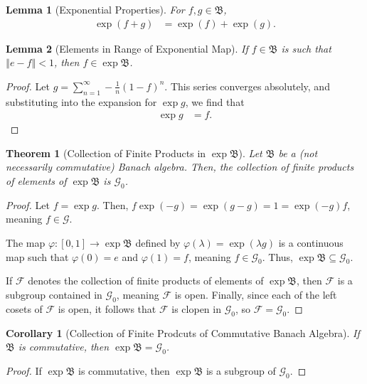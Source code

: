 \documentclass[10pt]{extarticle}
\newcommand{\norm}[1]{\left\Vert #1\right\Vert}
\theoremstyle{plain}
\newtheorem*{theorem}{Theorem}
\newtheorem*{lemma}{Lemma}
\newtheorem*{corollary}{Corollary}
\theoremstyle{definition}
\theoremstyle{note}
\renewcommand{\newline}{\hfill\break}
\begin{document}
\begin{lemma}[Exponential Properties]
  For $f,g\in \mathfrak{B}$,
  \begin{align*}
    \exp(f+g) &= \exp(f) + \exp(g).
  \end{align*}
\end{lemma}
\begin{lemma}[Elements in Range of Exponential Map]
  If $f\in \mathfrak{B}$ is such that $\norm{e-f} < 1$, then $f\in \exp \mathfrak{B}$.
\end{lemma}
\begin{proof}
  Let $g = \sum_{n=1}^{\infty}-\frac{1}{n}(1-f)^n$. This series converges absolutely, and substituting into the expansion for $\exp g$, we find that
  \begin{align*}
    \exp g &= f.
  \end{align*}
\end{proof}
\begin{theorem}[Collection of Finite Products in $\exp\mathfrak{B}$]
  Let $\mathfrak{B}$ be a (not necessarily commutative) Banach algebra. Then, the collection of finite products of elements of $\exp \mathfrak{B}$ is $\mathcal{G}_0$.
\end{theorem}
\begin{proof}
  Let $f = \exp g$. Then, $f\exp(-g) = \exp(g-g) = 1 = \exp(-g)f$, meaning $f\in \mathcal{G}$.\newline

  The map $\varphi: [0,1]\rightarrow \exp \mathfrak{B}$ defined by $\varphi(\lambda) = \exp\left(\lambda g\right)$ is a continuous map such that $\varphi(0) = e$ and $\varphi(1) = f$, meaning $f\in \mathcal{G}_0$. Thus, $\exp \mathfrak{B}\subseteq \mathcal{G}_0$.\newline

  If $\mathcal{F}$ denotes the collection of finite products of elements of $\exp \mathfrak{B}$, then $\mathcal{F}$ is a subgroup contained in $\mathcal{G}_0$, meaning $\mathcal{F}$ is open. Finally, since each of the left cosets of $\mathcal{F}$ is open, it follows that $\mathcal{F}$ is clopen in $\mathcal{G}_0$, so $\mathcal{F} = \mathcal{G}_0$.
\end{proof}
\begin{corollary}[Collection of Finite Prodcuts of Commutative Banach Algebra]
  If $\mathfrak{B}$ is commutative, then $\exp \mathfrak{B} = \mathcal{G}_0$.
\end{corollary}
\begin{proof}
  If $\exp \mathfrak{B}$ is commutative, then $\exp \mathfrak{B}$ is a subgroup of $\mathcal{G}_0$.
\end{proof}
\end{document}
